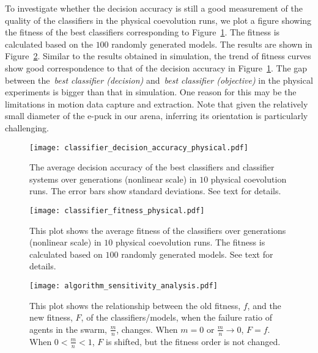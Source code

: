 To investigate whether the decision accuracy is still a good measurement of the quality of the classifiers in the physical coevolution runs, we plot a figure showing the fitness of the best classifiers corresponding to Figure~\ref{fig:classifier_decision_accuracy_physical}. The fitness is calculated based on the $100$ randomly generated models. The results are shown in Figure~\ref{fig:classifier_fitness_physical}. Similar to the results obtained in simulation, the trend of fitness curves show good correspondence to that of the decision accuracy in Figure~\ref{fig:classifier_decision_accuracy_physical}. The gap between the~\textit{best classifier (decision)} and~\textit{best classifier (objective)} in the physical experiments is bigger than that in simulation. One reason for this may be the limitations in motion data capture and extraction. Note that given the relatively small diameter of the e-puck in our arena, inferring its orientation is particularly challenging.

\begin{figure}[!t]
\centering
\texttt{[image: classifier\_decision\_accuracy\_physical.pdf]}
\caption{The average decision accuracy of the best classifiers and classifier systems over generations (nonlinear scale) in $10$ physical coevolution runs. The error bars show standard deviations. See text for details.}
\label{fig:classifier_decision_accuracy_physical}
\end{figure}

\begin{figure}[!t]
	\centering
	\texttt{[image: classifier\_fitness\_physical.pdf]}
	\caption{This plot shows the average fitness of the classifiers over generations (nonlinear scale) in $10$ physical coevolution runs. The fitness is calculated based on $100$ randomly generated models. See text for details.}
	\label{fig:classifier_fitness_physical}
\end{figure}

\begin{figure}[!t]
    \centering
    \texttt{[image: algorithm\_sensitivity\_analysis.pdf]}
    \caption{This plot shows the relationship between the old fitness, $f$, and the new fitness, $F$, of the classifiers/models, when the failure ratio of agents in the swarm, $\frac{m}{n}$, changes. When $m = 0$ or $\frac{m}{n} \rightarrow 0$, $F=f$. When $0 < \frac{m}{n} < 1$, $F$ is shifted, but the fitness order is not changed.}
    \label{fig:analysis_algorithm}
\end{figure}

